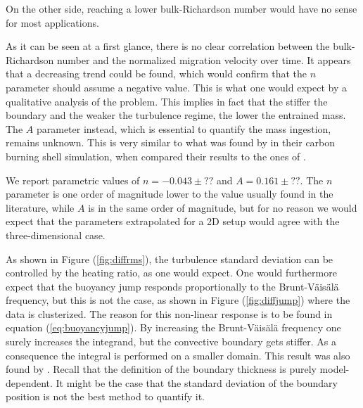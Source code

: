 On the other side, reaching a lower bulk-Richardson number would have no sense for most applications.


As it can be seen at a first glance, there is no clear correlation between the bulk-Richardson number and the normalized migration velocity over time. It appears that a decreasing trend could be found, which would confirm that the $n$ parameter should assume a negative value. This is what one would expect by a qualitative analysis of the problem. This implies in fact that the stiffer the boundary and the weaker the turbulence regime, the lower the entrained mass. The $A$ parameter instead, which is essential to quantify the mass ingestion, remains unknown. This is very similar to what was found by \citet{cristini} in their carbon burning shell simulation, when compared their results to the ones of \citet{meakin}. 

We report parametric values of $n=-0.043 \pm ??$ and $A=0.161 \pm ??$. The $n$ parameter is one order of magnitude lower to the value usually found in the literature, while $A$ is in the same order of magnitude, but for no reason we would expect that the parameters extrapolated for a 2D setup would agree with the three-dimensional case.

As shown in Figure (\ref{fig:diffrms}), the turbulence standard deviation can be controlled by the heating ratio, as one would expect. One would furthermore expect that the buoyancy jump responds proportionally to the Brunt-Väisälä frequency, but this is not the case, as shown in Figure (\ref{fig:diffjump}) where the data is clusterized. The reason for this non-linear response is to be found in equation (\ref{eq:buoyancyjump}). By increasing the Brunt-Väisälä frequency one surely increases the integrand, but the convective boundary gets stiffer. As a consequence the integral is performed on a smaller domain. This result was also found by \citet{arnett2009}. Recall that the definition of the boundary thickness is purely model-dependent. It might be the case that the standard deviation of the boundary position is not the best method to quantify it.




